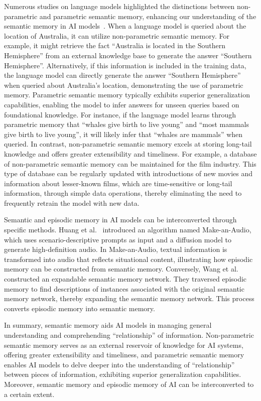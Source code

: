 \documentclass[journal,hideappendix]{vgtc}
\begin{document}
Numerous studies on language models highlighted the distinctions between non-parametric and parametric semantic memory, enhancing our understanding of the semantic memory in AI models~\cite{heinzerlinginui2021language,yu2023generate,mallen2023trust,kasai2024realtime}. 
When a language model is queried about the location of Australia, it can utilize non-parametric semantic memory. For example, it might retrieve the fact ``Australia is located in the Southern Hemisphere'' from an external knowledge base to generate the answer ``Southern Hemisphere''. 
Alternatively, if this information is included in the training data, the language model can directly generate the answer ``Southern Hemisphere'' when queried about Australia's location, demonstrating the use of parametric memory. 
Parametric semantic memory typically exhibits superior generalization capabilities, enabling the model to infer answers for unseen queries based on foundational knowledge. 
For instance, if the language model learns through parametric memory that ``whales give birth to live young'' and ``most mammals give birth to live young'', it will likely infer that ``whales are mammals'' when queried. 
In contrast, non-parametric semantic memory excels at storing long-tail knowledge and offers greater extensibility and timeliness. For example, a database of non-parametric semantic memory can be maintained for the film industry. 
This type of database can be regularly updated with introductions of new movies and information about lesser-known films, which are time-sensitive or long-tail information, through simple data operations, thereby eliminating the need to frequently retrain the model with new data.

Semantic and episodic memory in AI models can be interconverted through specific methods. Huang et al.~\cite{rongjie2023makeanaudio} introduced an algorithm named Make-an-Audio, which uses scenario-descriptive prompts as input and a diffusion model to generate high-definition audio. In Make-an-Audio, textual information is transformed into audio that reflects situational content, illustrating how episodic memory can be constructed from semantic memory. Conversely, Wang et al.~\cite{wang2016semantic} constructed an expandable semantic memory network. They traversed episodic memory to find descriptions of instances associated with the original semantic memory network, thereby expanding the semantic memory network. This process converts episodic memory into semantic memory.

In summary, semantic memory aids AI models in managing general understanding and comprehending ``relationship'' of information. Non-parametric semantic memory serves as an external reservoir of knowledge for AI systems, offering greater extensibility and timeliness, and parametric semantic memory enables AI models to delve deeper into the understanding of ``relationship'' between pieces of information, exhibiting superior generalization capabilities. Moreover, semantic memory and episodic memory of AI can be interconverted to a certain extent.
\end{document}
